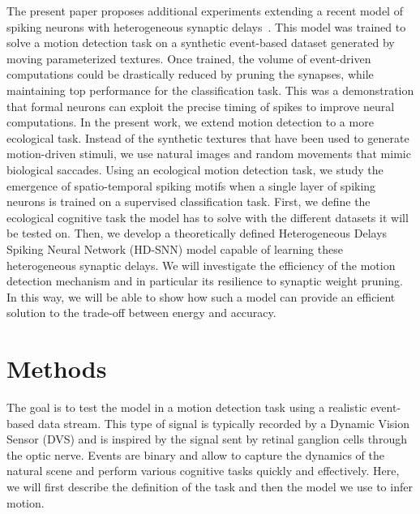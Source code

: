 \documentclass[default]{sn-jnl}%
\theoremstyle{thmstyleone}%
\theoremstyle{thmstyletwo}%
\theoremstyle{thmstylethree}%
\begin{document}
The present paper proposes additional experiments extending a recent model of spiking neurons with heterogeneous synaptic delays~\cite{grimaldi_learning_2022}. This model was trained to solve a motion detection task on a synthetic event-based dataset generated by moving parameterized textures. Once trained, the volume of event-driven computations could be drastically reduced by pruning the synapses, while maintaining top performance for the classification task. This was a demonstration that formal neurons can exploit the precise timing of spikes to improve neural computations. In the present work, we extend motion detection to a more ecological task. Instead of the synthetic textures that have been used to generate motion-driven stimuli, we use natural images and random movements that mimic biological saccades. Using an ecological motion detection task, we study the emergence of spatio-temporal spiking motifs when a single layer of spiking neurons is trained on a supervised classification task. First, we define the ecological cognitive task the model has to solve with the different datasets it will be tested on. Then, we develop a theoretically defined Heterogeneous Delays Spiking Neural Network (HD-SNN) model capable of learning these heterogeneous synaptic delays. We will investigate the efficiency of the motion detection mechanism and in particular its resilience to synaptic weight pruning. In this way, we will be able to show how such a model can provide an efficient solution to the trade-off between energy and accuracy.
%
\section{Methods}
\label{sec:methods}
The goal is to test the model in a motion detection task using a realistic event-based data stream. This type of signal is typically recorded by a Dynamic Vision Sensor (DVS) and is inspired by the signal sent by retinal ganglion cells through the optic nerve. Events are binary and allow to capture the dynamics of the natural scene and perform various cognitive tasks quickly and effectively. Here, we will first describe the definition of the task and then the model we use to infer motion. %
%
\end{document}
